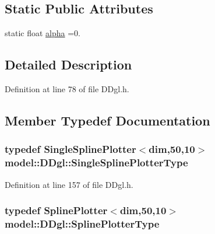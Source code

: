 \subsection*{Static Public Attributes}
\begin{DoxyCompactItemize}
\item 
static float \hyperlink{structmodel_1_1_d_dgl_a82287a9de418978aa6fcebda746a3cb4}{alpha} =0.
\end{DoxyCompactItemize}


\subsection{Detailed Description}


Definition at line 78 of file D\+Dgl.\+h.



\subsection{Member Typedef Documentation}
\hypertarget{structmodel_1_1_d_dgl_ae494f51463346f19c7f000e2dd295eb3}{}
\subsubsection[{Single\+Spline\+Plotter\+Type}]{\setlength{\rightskip}{0pt plus 5cm}typedef {\bf Single\+Spline\+Plotter}$<${\bf dim},50,10$>$ {\bf model\+::\+D\+Dgl\+::\+Single\+Spline\+Plotter\+Type}}\label{structmodel_1_1_d_dgl_ae494f51463346f19c7f000e2dd295eb3}


Definition at line 157 of file D\+Dgl.\+h.

\hypertarget{structmodel_1_1_d_dgl_aecff5e88105f42e8ba511771664a9fed}{}
\subsubsection[{Spline\+Plotter\+Type}]{\setlength{\rightskip}{0pt plus 5cm}typedef {\bf Spline\+Plotter}$<${\bf dim},50,10$>$ {\bf model\+::\+D\+Dgl\+::\+Spline\+Plotter\+Type}}\label{structmodel_1_1_d_dgl_aecff5e88105f42e8ba511771664a9fed}


